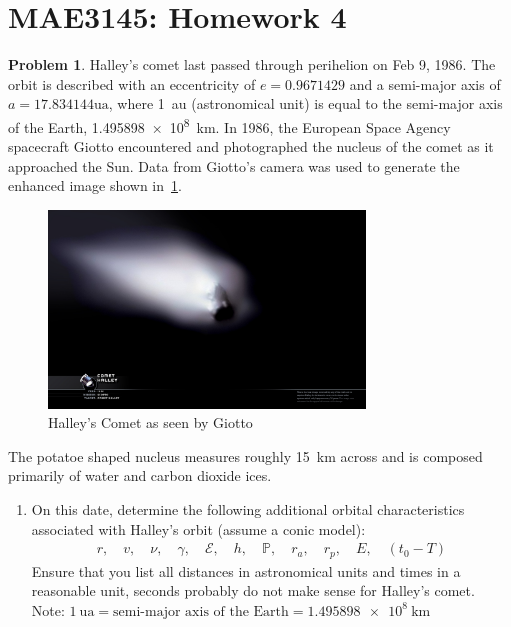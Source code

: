 \documentclass[10pt]{article}
\date{}
\theoremstyle{definition}
\newtheorem{prob}{Problem}[section]
\newenvironment{subprob}%
{\renewcommand{\theenumi}{\alph{enumi}}\renewcommand{\labelenumi}{(\theenumi)}\begin{enumerate}}%
{\end{enumerate}}%
\begin{document}
\setcounter{page}{1}
\pagestyle{plain}
\section*{MAE3145: Homework 4}
\vspace*{-0.4cm}

\begin{prob}
    Halley's comet last passed through perihelion on Feb 9, 1986.
    The orbit is described with an eccentricity of \( e = 0.9671429\) and a semi-major axis of \( a = 17.834144 \si{\astronomicalunit} \), where \SI{1}{\astronomicalunit} (astronomical unit) is equal to the semi-major axis of the Earth, \SI{1.495898e8}{\kilo\meter}.
    In 1986, the European Space Agency spacecraft Giotto encountered and photographed the nucleus of the comet as it approached the Sun.
    Data from Giotto's camera was used to generate the enhanced image shown in~\cref{fig:halley}.
    \begin{figure}[htbp]
        \centering
        \includegraphics[width=0.75\textwidth, keepaspectratio]{figures/halley.jpg}
        \caption{Halley's Comet as seen by Giotto\label{fig:halley}}
    \end{figure}
    The potatoe shaped nucleus measures roughly \SI{15}{\kilo\meter} across and is composed primarily of water and carbon dioxide ices.

    \begin{subprob}
    \item On this date, determine the following additional orbital characteristics associated with Halley's orbit (assume a conic model):
        \begin{align*}
            r, \quad v, \quad \nu, \quad \gamma, \quad \mathcal{E}, \quad h, \quad \mathbb{P}, \quad r_a, \quad r_p, \quad E, \quad (t_0 - T)
        \end{align*}
        Ensure that you list all distances in astronomical units and times in a reasonable unit, seconds probably do not make sense for Halley's comet.
        Note: \(\SI{1}{\astronomicalunit} = \text{semi-major axis of the Earth} = \SI{1.495898e8}{\kilo\meter}\)


\end{subprob}
\end{prob}
\end{document}
